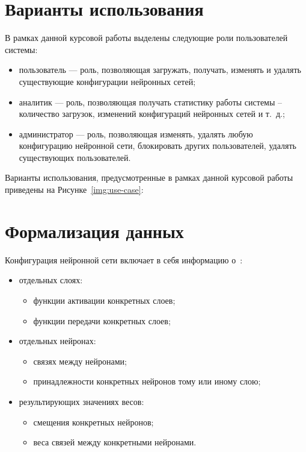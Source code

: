 \section{Варианты использования}

В рамках данной курсовой работы выделены следующие роли пользователей системы:
\begin{itemize}
    \item пользователь --- роль, позволяющая загружать, получать, изменять и удалять существующие конфигурации нейронных сетей;
    \item аналитик --- роль, позволяющая получать статистику работы системы -- количество загрузок, изменений конфигураций нейронных сетей и т.~д.;
    \item администратор --- роль, позволяющая изменять, удалять любую конфигурацию нейронной сети, блокировать других пользователей, удалять существующих пользователей.
\end{itemize}

Варианты использования, предусмотренные в рамках данной курсовой работы приведены на Рисунке~\ref{img:use-case}:


\section{Формализация данных}

Конфигурация нейронной сети включает в себя информацию о~\cite{sharkawy-neural}:

\begin{itemize}
    \item отдельных слоях:
        \begin{itemize}
            \item функции активации конкретных слоев;
            \item функции передачи конкретных слоев;
        \end{itemize}
    \item отдельных нейронах:
        \begin{itemize}
            \item связях между нейронами;
            \item принадлежности конкретных нейронов тому или иному слою;
        \end{itemize}
    \item результирующих значениях весов:
        \begin{itemize}
            \item смещения конкретных нейронов;
            \item веса связей между конкретными нейронами.
        \end{itemize}
\end{itemize}

